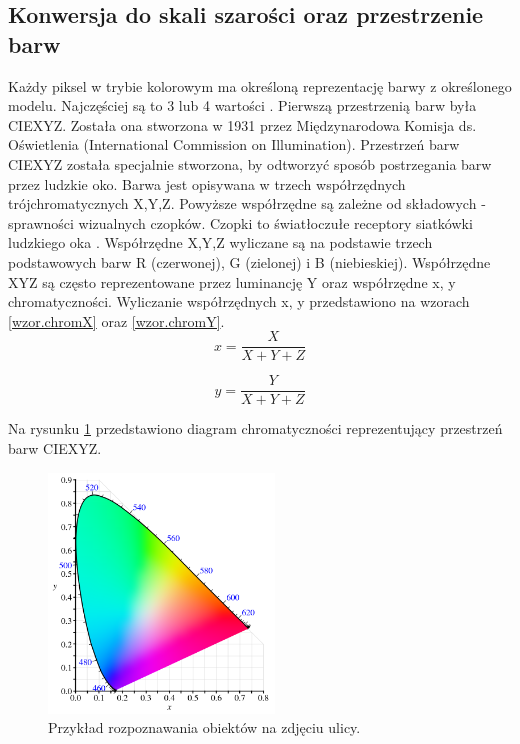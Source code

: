 \documentclass[a4paper,twoside,12pt]{book}
\begin{document}
    \subsection{Konwersja do skali szarości oraz przestrzenie barw}\label{subsec:konwersja-do-skali-szarości-oraz-przestrzenie-barw}
    Każdy piksel w trybie kolorowym ma określoną reprezentację barwy z określonego modelu.
    Najczęściej są to 3 lub 4 wartości \cite{przestrzenieKolorow}.
    Pierwszą przestrzenią barw była CIEXYZ. Została ona stworzona w 1931 przez
    Międzynarodowa Komisja ds. Oświetlenia (International Commission on Illumination).
    Przestrzeń barw CIEXYZ została specjalnie stworzona, by odtworzyć sposób postrzegania barw przez ludzkie oko.
    Barwa jest opisywana w trzech współrzędnych trójchromatycznych X,Y,Z.
    Powyższe współrzędne są zależne od składowych - sprawności wizualnych czopków.
    Czopki to światłoczułe receptory siatkówki ludzkiego oka \cite{przestrzenieKolorow}.
    Współrzędne X,Y,Z wyliczane są na podstawie trzech podstawowych barw R (czerwonej),
    G (zielonej) i B (niebieskiej).
    Współrzędne XYZ są często reprezentowane przez luminancję Y oraz współrzędne x, y chromatyczności.
    Wyliczanie współrzędnych x, y przedstawiono na wzorach \ref{wzor.chromX} oraz \ref{wzor.chromY}.
    \large
    \begin{equation}
        x = \frac{X}{X+Y+Z}
        \label{wzor.chromX}
    \end{equation}
    \normalsize

    \large
    \begin{equation}
        y = \frac{Y}{X+Y+Z}
        \label{wzor.chromY}
    \end{equation}
    \normalsize

    Na rysunku \ref{fig.CIEXYZ} przedstawiono diagram chromatyczności reprezentujący przestrzeń barw CIEXYZ.

    \begin{figure}
        \centering
        \includegraphics[width=6cm]{Obrazy/CIEXYZ.jpg}
        \caption{Przykład rozpoznawania obiektów na zdjęciu ulicy. \cite{diagramCIEXYZ}}
        \label{fig.CIEXYZ}
    \end{figure}
\end{document}
